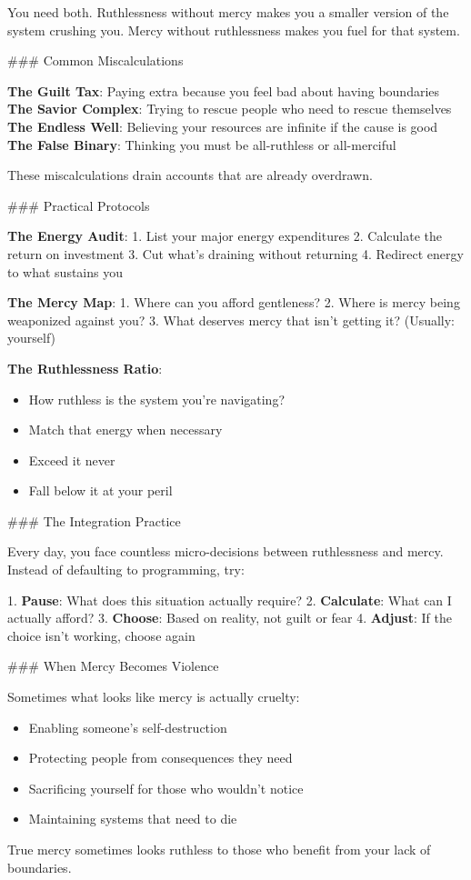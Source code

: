 \documentclass[12pt]{book}
\begin{document}
You need both. Ruthlessness without mercy makes you a smaller version of the system crushing you. Mercy without ruthlessness makes you fuel for that system.

\#\#\# Common Miscalculations

\textbf{The Guilt Tax}: Paying extra because you feel bad about having boundaries
\textbf{The Savior Complex}: Trying to rescue people who need to rescue themselves
\textbf{The Endless Well}: Believing your resources are infinite if the cause is good
\textbf{The False Binary}: Thinking you must be all-ruthless or all-merciful

These miscalculations drain accounts that are already overdrawn.

\#\#\# Practical Protocols

\textbf{The Energy Audit}:
1. List your major energy expenditures
2. Calculate the return on investment
3. Cut what's draining without returning
4. Redirect energy to what sustains you

\textbf{The Mercy Map}:
1. Where can you afford gentleness?
2. Where is mercy being weaponized against you?
3. What deserves mercy that isn't getting it? (Usually: yourself)

\textbf{The Ruthlessness Ratio}:
\begin{itemize}
\item How ruthless is the system you're navigating?
\item Match that energy when necessary
\item Exceed it never
\item Fall below it at your peril

\end{itemize}
\#\#\# The Integration Practice

Every day, you face countless micro-decisions between ruthlessness and mercy. Instead of defaulting to programming, try:

1. \textbf{Pause}: What does this situation actually require?
2. \textbf{Calculate}: What can I actually afford?
3. \textbf{Choose}: Based on reality, not guilt or fear
4. \textbf{Adjust}: If the choice isn't working, choose again

\#\#\# When Mercy Becomes Violence

Sometimes what looks like mercy is actually cruelty:

\begin{itemize}
\item Enabling someone's self-destruction
\item Protecting people from consequences they need
\item Sacrificing yourself for those who wouldn't notice
\item Maintaining systems that need to die

\end{itemize}
True mercy sometimes looks ruthless to those who benefit from your lack of boundaries.
\end{document}
